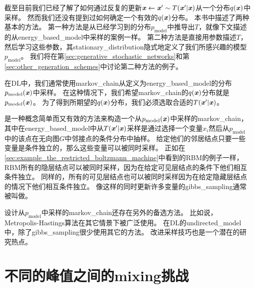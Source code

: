 截至目前我们已经了解了如何通过反复的更新$\boldsymbol{\mathit{x}} \xleftarrow{} \boldsymbol{\mathit{x}}'\sim T(\boldsymbol{\mathit{x}}'\vert\boldsymbol{\mathit{x}})$从一个分布$q(\boldsymbol{\mathit{x}})$中采样。
然而我们还没有提到过如何确定一个有效的$q(\boldsymbol{\mathit{x}})$分布。
本书中描述了两种基本的方法。
第一种方法是从已经学习到的分布$p_{\text{model}}$中推导出$T$，就像下文描述的从\gls{energy_based_model}中采样的案例一样。
第二种方法是直接用参数描述$T$，然后学习这些参数，其\gls{stationary_distribution}隐式地定义了我们所感兴趣的模型$p_{\text{model}}$。
我们将在第\ref{sec:generative_stochastic_networks}和第\ref{sec:other_generation_schemes}中讨论第二种方法的例子。


在\gls{DL}中，我们通常使用\gls{markov_chain}从定义为\gls{energy_based_model}的分布$p_{\text{model}}(\boldsymbol{\mathit{x}})$中采样。
在这种情况下，我们希望\gls{markov_chain}的$q(\boldsymbol{\mathit{x}})$分布就是$p_{\text{model}}(\boldsymbol{\mathit{x}})$。
为了得到所期望的$q(\boldsymbol{\mathit{x}})$分布，我们必须选取合适的$T(\boldsymbol{\mathit{x}}'\vert \boldsymbol{\mathit{x}})$。


是一种概念简单而又有效的方法来构造一个从$p_{\text{model}}(\boldsymbol{\mathit{x}})$中采样的\gls{markov_chain}，其中在\gls{energy_based_model}中从$T(\boldsymbol{\mathit{x}}'\vert \boldsymbol{\mathit{x}})$采样是通过选择一个变量$x_i$然后从$p_{\text{model}}$中的该点在无向图$G$中邻接点的条件分布中抽样。
给定他们的邻居结点只要一些变量是条件独立的，那么这些变量可以被同时采样。
正如在\ref{sec:example_the_restricted_boltzmann_machine}中看到的\gls{RBM}的例子一样，\gls{RBM}所有的隐层结点可以被同时采样，因为在给定可见层结点的条件下他们相互条件独立。
同样的，所有的可见层结点也可以被同时采样因为在给定隐藏层结点的情况下他们相互条件独立。
像这样的同时更新许多变量的\gls{gibbs_sampling}通常被叫做。

设计从$p_{\text{model}}$中采样的\gls{markov_chain}还存在另外的备选方法。
比如说，Metropolis-Hastings算法在其它情景下被广泛使用。
在\gls{DL}的\gls{undirected_model}中，除了\gls{gibbs_sampling}很少使用其它的方法。
改进采样技巧也是一个潜在的研究热点。


\section{不同的峰值之间的\gls{mixing}挑战}
\label{sec:the_challenge_of_mixing_between_separated_modes}


